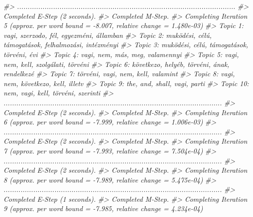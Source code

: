 \documentclass[
]{book}
\newenvironment{Shaded}{\begin{snugshade}}{\end{snugshade}}
\newcommand{\CommentTok}[1]{\textcolor[rgb]{0.56,0.35,0.01}{\textit{#1}}}
\begin{document}
\begin{Shaded}
\begin{Highlighting}[]
\CommentTok{\#\textgreater{} .......................................................................................................}
\CommentTok{\#\textgreater{} Completed E{-}Step (2 seconds). }
\CommentTok{\#\textgreater{} Completed M{-}Step. }
\CommentTok{\#\textgreater{} Completing Iteration 5 (approx. per word bound = {-}8.007, relative change = 1.480e{-}03) }
\CommentTok{\#\textgreater{} Topic 1: vagi, szerzodo, fél, egyezméni, államban }
\CommentTok{\#\textgreater{}  Topic 2: muködési, célú, támogatások, felhalmozási, intézményi }
\CommentTok{\#\textgreater{}  Topic 3: muködési, célú, támogatások, törvéni, évi }
\CommentTok{\#\textgreater{}  Topic 4: vagi, nem, más, meg, valamennyi }
\CommentTok{\#\textgreater{}  Topic 5: vagi, nem, kell, szolgálati, törvéni }
\CommentTok{\#\textgreater{}  Topic 6: következo, helyéb, törvéni, ának, rendelkezé }
\CommentTok{\#\textgreater{}  Topic 7: törvéni, vagi, nem, kell, valamint }
\CommentTok{\#\textgreater{}  Topic 8: vagi, nem, következo, kell, illetv }
\CommentTok{\#\textgreater{}  Topic 9: the, and, shall, vagi, parti }
\CommentTok{\#\textgreater{}  Topic 10: nem, vagi, kell, törvéni, szerinti }
\CommentTok{\#\textgreater{} .......................................................................................................}
\CommentTok{\#\textgreater{} Completed E{-}Step (2 seconds). }
\CommentTok{\#\textgreater{} Completed M{-}Step. }
\CommentTok{\#\textgreater{} Completing Iteration 6 (approx. per word bound = {-}7.999, relative change = 1.006e{-}03) }
\CommentTok{\#\textgreater{} .......................................................................................................}
\CommentTok{\#\textgreater{} Completed E{-}Step (2 seconds). }
\CommentTok{\#\textgreater{} Completed M{-}Step. }
\CommentTok{\#\textgreater{} Completing Iteration 7 (approx. per word bound = {-}7.993, relative change = 7.504e{-}04) }
\CommentTok{\#\textgreater{} .......................................................................................................}
\CommentTok{\#\textgreater{} Completed E{-}Step (2 seconds). }
\CommentTok{\#\textgreater{} Completed M{-}Step. }
\CommentTok{\#\textgreater{} Completing Iteration 8 (approx. per word bound = {-}7.989, relative change = 5.475e{-}04) }
\CommentTok{\#\textgreater{} .......................................................................................................}
\CommentTok{\#\textgreater{} Completed E{-}Step (1 seconds). }
\CommentTok{\#\textgreater{} Completed M{-}Step. }
\CommentTok{\#\textgreater{} Completing Iteration 9 (approx. per word bound = {-}7.985, relative change = 4.234e{-}04) }

\end{Highlighting}
\end{Shaded}
\end{document}
